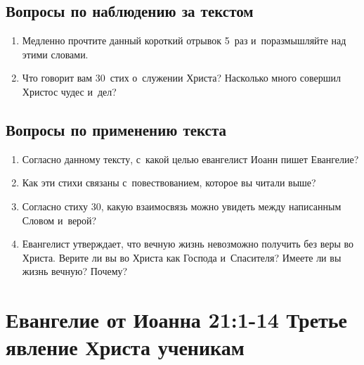 \documentclass[a4paper,12pt]{article}
\begin{document}
\subsection*{Вопросы по наблюдению за текстом}
\begin{enumerate}
    \item Медленно прочтите данный короткий отрывок 5~раз и~поразмышляйте над этими словами. 
    
    \myline
    
    \myline
    \item Что говорит вам 30~стих о~служении Христа? Насколько много совершил Христос чудес и~дел?
    
    \myline
    
    \myline
\end{enumerate}

\subsection*{Вопросы по применению текста} 
\begin{enumerate}
    \item Согласно данному тексту, с~какой целью евангелист Иоанн пишет Евангелие? 
    
    \myline
    
    \myline
    \item Как эти стихи связаны с~повествованием, которое вы читали выше?
    
    \myline
    
    \myline
    \item Согласно стиху 30, какую взаимосвязь можно увидеть между написанным Словом и~верой? 
    
    \myline
    
    \myline

    \item Евангелист утверждает, что вечную жизнь невозможно получить без веры во Христа. Верите ли вы во Христа как Господа и~Спасителя? Имеете ли вы жизнь вечную? Почему? 
    
    \myline
    
    \myline
\end{enumerate}



\section{Евангелие от Иоанна 21:1-14 Третье явление Христа ученикам}
\end{document}
